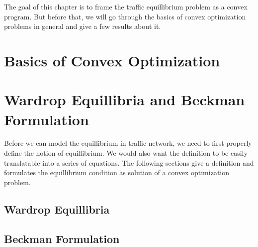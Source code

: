 The goal of this chapter is to  frame the traffic equillibrium problem
as a convex program. But before that, we will go through the basics of
convex optimization problems in general and give a few
results about it.


\section{Basics of Convex Optimization}


\section{Wardrop Equillibria and Beckman Formulation}
	Before we can model the equillibrium in traffic network, we need
	to first properly define the notion of equillibrium. We would also
	want the definition to be easily translatable into a series of
	equations. The following sections give a definition and
	formulates the equillibrium condition as solution of a
	convex optimization problem.

	\subsection{Wardrop Equillibria}
	
	

	\subsection{Beckman Formulation}
	

